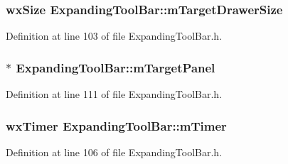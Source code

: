 \subsubsection[{\texorpdfstring{m\+Target\+Drawer\+Size}{mTargetDrawerSize}}]{\setlength{\rightskip}{0pt plus 5cm}wx\+Size Expanding\+Tool\+Bar\+::m\+Target\+Drawer\+Size\hspace{0.3cm}{\ttfamily [protected]}}\hypertarget{class_expanding_tool_bar_abc91f2699afd19e8cc0da9ba7e4a072c}{}\label{class_expanding_tool_bar_abc91f2699afd19e8cc0da9ba7e4a072c}


Definition at line 103 of file Expanding\+Tool\+Bar.\+h.

\subsubsection[{\texorpdfstring{m\+Target\+Panel}{mTargetPanel}}]{$\ast$ Expanding\+Tool\+Bar\+::m\+Target\+Panel\hspace{0.3cm}{\ttfamily [protected]}}\hypertarget{class_expanding_tool_bar_ab44c26c8f8580848e45e09a37c6d81e1}{}\label{class_expanding_tool_bar_ab44c26c8f8580848e45e09a37c6d81e1}


Definition at line 111 of file Expanding\+Tool\+Bar.\+h.

\subsubsection[{\texorpdfstring{m\+Timer}{mTimer}}]{\setlength{\rightskip}{0pt plus 5cm}wx\+Timer Expanding\+Tool\+Bar\+::m\+Timer\hspace{0.3cm}{\ttfamily [protected]}}\hypertarget{class_expanding_tool_bar_a36c716937d5f9ebe9a0f3a1aa357f17a}{}\label{class_expanding_tool_bar_a36c716937d5f9ebe9a0f3a1aa357f17a}


Definition at line 106 of file Expanding\+Tool\+Bar.\+h.


